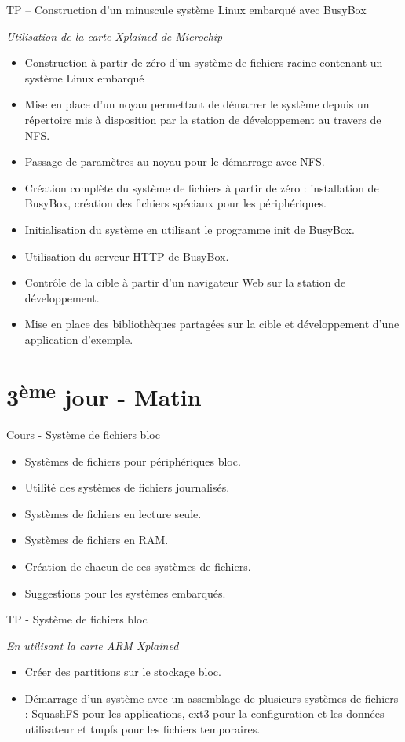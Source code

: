 \documentclass[a4paper,12pt,obeyspaces,spaces,hyphens]{article}
\begin{document}
\feagendaonecolumn
{TP – Construction d'un minuscule système Linux embarqué avec BusyBox}
{
  {\em Utilisation de la carte Xplained de Microchip}
  \begin{itemize}
  \item Construction à partir de zéro d'un système de fichiers racine
	contenant un système Linux embarqué
  \item Mise en place d'un noyau permettant de démarrer le système
	depuis un répertoire mis à disposition par la station de
	développement au travers de NFS.
  \item Passage de paramètres au noyau pour le démarrage avec NFS.
  \item Création complète du système de fichiers à partir de zéro :
	installation de BusyBox, création des fichiers spéciaux
	pour les périphériques.
  \item Initialisation du système en utilisant le programme init de BusyBox.
  \item Utilisation du serveur HTTP de BusyBox.
  \item Contrôle de la cible à partir d'un navigateur Web sur la
	station de développement.
  \item Mise en place des bibliothèques partagées sur la cible et
	développement d'une application d'exemple.
  \end{itemize}
}

\section{3\textsuperscript{ème} jour - Matin}

\feagendatwocolumn
{Cours - Système de fichiers bloc}
{
  \begin{itemize}
  \item Systèmes de fichiers pour périphériques bloc.
  \item Utilité des systèmes de fichiers journalisés.
  \item Systèmes de fichiers en lecture seule.
  \item Systèmes de fichiers en RAM.
  \item Création de chacun de ces systèmes de fichiers.
  \item Suggestions pour les systèmes embarqués.
  \end{itemize}
}
{TP - Système de fichiers bloc}
{
  {\em En utilisant la carte ARM Xplained}
  \begin{itemize}
  \item Créer des partitions sur le stockage bloc.
  \item Démarrage d'un système avec un assemblage de plusieurs systèmes
	de fichiers : SquashFS pour les applications, ext3 pour la
 	configuration et les données utilisateur et tmpfs pour les
	fichiers temporaires.
  \end{itemize}
}
\end{document}
